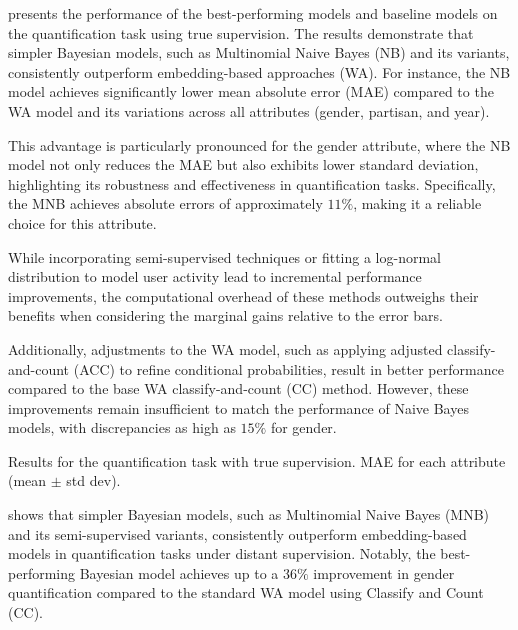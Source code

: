  presents the performance of the best-performing models and baseline models on the quantification task using true supervision.
The results demonstrate that simpler Bayesian models, such as Multinomial Naive Bayes (NB) and its variants, consistently outperform embedding-based approaches (WA).
For instance, the NB model achieves significantly lower mean absolute error (MAE) compared to the WA model and its variations across all attributes (gender, partisan, and year).

This advantage is particularly pronounced for the gender attribute, where the NB model not only reduces the MAE but also exhibits lower standard deviation, highlighting its robustness and effectiveness in quantification tasks.
Specifically, the MNB achieves absolute errors of approximately $11\%$, making it a reliable choice for this attribute.

While incorporating semi-supervised techniques or fitting a log-normal distribution to model user activity lead to incremental performance improvements, the computational overhead of these methods outweighs their benefits when considering the marginal gains relative to the error bars.

Additionally, adjustments to the WA model, such as applying adjusted classify-and-count (ACC) to refine conditional probabilities, result in better performance compared to the base WA classify-and-count (CC) method.
However, these improvements remain insufficient to match the performance of Naive Bayes models, with discrepancies as high as $15\%$ for gender.


\begin{table}[t]
\caption{Results for the quantification task with true supervision. MAE for each attribute (mean $\pm$ std dev).}
\centering
\resizebox{\columnwidth}{!}{}
\label{table:quant-true}
\end{table}

 shows that simpler Bayesian models, such as Multinomial Naive Bayes (MNB) and its semi-supervised variants, consistently outperform embedding-based models in quantification tasks under distant supervision.
Notably, the best-performing Bayesian model achieves up to a $36\%$ improvement in gender quantification compared to the standard WA model using Classify and Count (CC).

